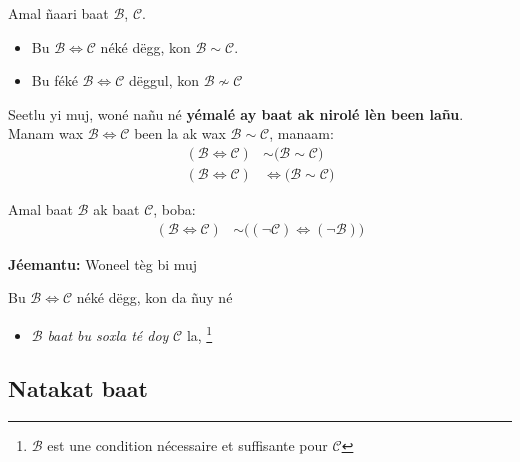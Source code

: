 \documentclass[twoside, a4paper]{article}
\begin{document}
\begin{tcolorbox}[enhanced jigsaw,breakable,pad at break*=1mm,
colback=yellow!5!white,colframe=white!75!black,title= Seetlu,
  watermark color=white]
  Amal ñaari baat $\mathcal{B}$, $\mathcal{C}$.
  \begin{itemize}
      \item Bu $\mathcal{B}\iff\mathcal{C}$ néké dëgg, kon $\mathcal{B}\sim \mathcal{C}$.
      \item Bu féké $\mathcal{B}\iff\mathcal{C}$ dëggul, kon $\mathcal{B}\not\sim\mathcal{C}$  
  \end{itemize}

Seetlu yi muj, woné nañu né \textbf{yémalé ay baat ak nirolé lèn been lañu}. Manam wax $\mathcal{B}\iff\mathcal{C}$ been la ak wax $\mathcal{B}\sim \mathcal{C}$, manaam: 
\begin{align*}
    (\mathcal{B} \iff \mathcal{C}) &\sim \big( \mathcal{B} \sim \mathcal{C}\big)\\
    (\mathcal{B} \iff \mathcal{C}) &\iff \big( \mathcal{B} \sim \mathcal{C}\big)
\end{align*}
\end{tcolorbox}
\begin{tcolorbox}[enhanced jigsaw,breakable,pad at break*=1mm, colback=blue!5!white,colframe=white!75!black,title= Tèg\footnote{Proposition},
  watermark color=white]
Amal baat $\mathcal{B}$ ak baat $\mathcal{C}$, boba:
\begin{align*}
    (\mathcal{B} \iff \mathcal{C}) &\sim \big( (\neg\mathcal{C}) \iff (\neg \mathcal{B}) \big)
\end{align*} 
\end{tcolorbox}

\textbf{Jéemantu:} Woneel tèg bi muj

\begin{tcolorbox}[enhanced jigsaw,breakable,pad at break*=1mm, colback=red!5!white,colframe=white!75!black,title= Téeki,
  watermark color=white]
Bu $\mathcal{B} \iff \mathcal{C}$ néké dëgg, kon da ñuy né\\
\begin{itemize}
    \item $\mathcal{B}$ \textit{baat bu soxla té doy} $\mathcal{C}$ la, \footnote{$\mathcal{B}$ est une condition nécessaire et suffisante pour $\mathcal{C}$}
\end{itemize}
\end{tcolorbox}

\subsection{Natakat baat}
\end{document}
